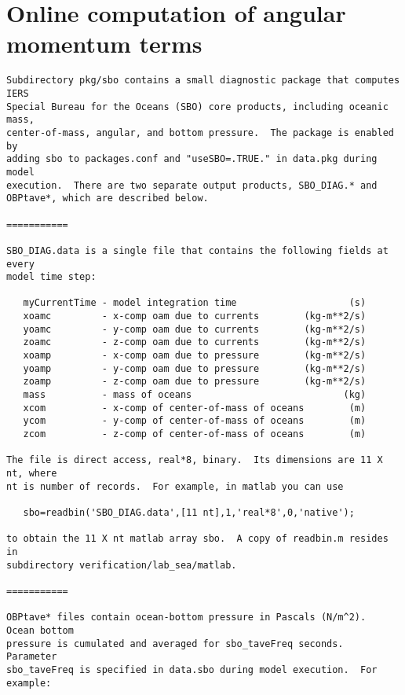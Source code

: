 
\chapter{Online computation of angular momentum terms}

\begin{verbatim}
Subdirectory pkg/sbo contains a small diagnostic package that computes IERS
Special Bureau for the Oceans (SBO) core products, including oceanic mass,
center-of-mass, angular, and bottom pressure.  The package is enabled by
adding sbo to packages.conf and "useSBO=.TRUE." in data.pkg during model
execution.  There are two separate output products, SBO_DIAG.* and
OBPtave*, which are described below.

===========

SBO_DIAG.data is a single file that contains the following fields at every
model time step:

   myCurrentTime - model integration time                    (s)
   xoamc         - x-comp oam due to currents        (kg-m**2/s)
   yoamc         - y-comp oam due to currents        (kg-m**2/s)
   zoamc         - z-comp oam due to currents        (kg-m**2/s)
   xoamp         - x-comp oam due to pressure        (kg-m**2/s)
   yoamp         - y-comp oam due to pressure        (kg-m**2/s)
   zoamp         - z-comp oam due to pressure        (kg-m**2/s)
   mass          - mass of oceans                           (kg)
   xcom          - x-comp of center-of-mass of oceans        (m)
   ycom          - y-comp of center-of-mass of oceans        (m)
   zcom          - z-comp of center-of-mass of oceans        (m)

The file is direct access, real*8, binary.  Its dimensions are 11 X nt, where
nt is number of records.  For example, in matlab you can use

   sbo=readbin('SBO_DIAG.data',[11 nt],1,'real*8',0,'native');

to obtain the 11 X nt matlab array sbo.  A copy of readbin.m resides in
subdirectory verification/lab_sea/matlab.

===========

OBPtave* files contain ocean-bottom pressure in Pascals (N/m^2).  Ocean bottom
pressure is cumulated and averaged for sbo_taveFreq seconds.  Parameter
sbo_taveFreq is specified in data.sbo during model execution.  For example:


\end{verbatim}
